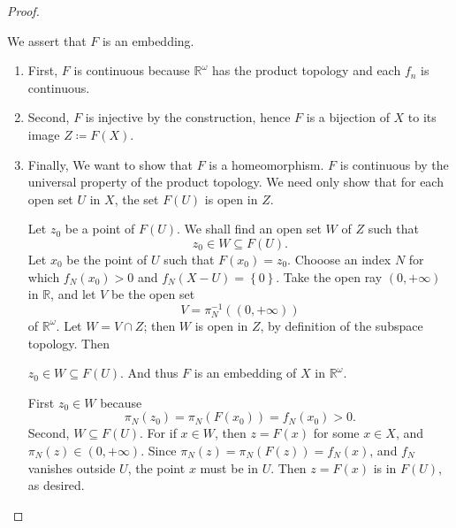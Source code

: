 \begin{proof}
\begin{enumerate}
\[      \]
      We assert that \( F \) is an embedding.
      \begin{enumerate}
        \item First, \( F \) is continuous because \( \mathbb{R}^\omega \) has the product topology and each \( f_n \) is continuous.
        \item Second, \( F \) is injective by the construction, hence \( F \) is a bijection of \( X \) to its image \( Z \coloneq F(X) \).
        \item Finally, We want to show that \( F \) is a homeomorphism.
          \( F \) is continuous by the universal property of the product topology.
          We need only show that for each open set \( U \) in \( X \), the set \( F(U) \) is open in \( Z \).

          Let \( z_0 \) be a point of \( F(U) \).
          We shall find an open set \( W \) of \( Z \) such that
          \[
            z_0 \in W \subseteq F(U).
          \]
          Let \( x_0 \) be the point of \( U \) such that \( F(x_0) = z_0 \).
          Chooose an index \( N \) for which \( f_N(x_0) > 0 \) and \( f_N(X - U) = \left\lbrace 0 \right\rbrace \).
          Take the open ray \( (0, +\infty) \) in \( \mathbb{R} \), and let \( V \) be the open set
          \[
            V = \pi^{-1}_N((0, + \infty))
          \]
          of \( \mathbb{R}^\omega \).
          Let \( W = V \cap Z \); then \( W \) is open in \( Z \), by definition of the subspace topology.
          Then
          \begin{claim}
            \( z_0 \in W \subseteq F(U) \).
            And thus \( F \) is an embedding of \( X \) in \( \mathbb{R}^\omega \).
          \end{claim}
          \begin{claimproof}
            First \( z_0 \in W \) because
            \[
              \pi_N(z_0) = \pi_N(F(x_0)) = f_N(x_0) > 0.
            \]
            Second, \( W \subseteq F(U) \).
            For if \( x \in W \), then \( z = F(x) \) for some \( x \in X \), and \( \pi_N(z) \in (0, + \infty) \).
            Since \( \pi_N(z) = \pi_N(F(z)) = f_N(x) \), and \( f_N \) vanishes outside \( U \), the point \( x \) must be in \( U \).
            Then \( z = F(x) \) is in \( F(U) \), as desired.
          \end{claimproof}
      \end{enumerate}
  \end{enumerate}
\end{proof}

